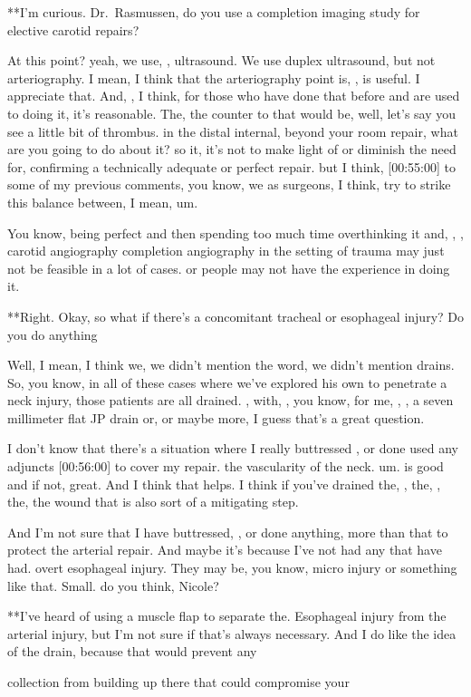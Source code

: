 \documentclass[
]{book}
\begin{document}
**I'm curious. Dr.~Rasmussen, do
you use a completion imaging study for elective carotid repairs?

At this
point? yeah, we use, , ultrasound. We use duplex ultrasound, but not
arteriography. I mean, I think that the arteriography point is, , is
useful. I appreciate that. And, , I think, for those who have done that
before and are used to doing it, it's reasonable. The, the counter to
that would be, well, let's say you see a little bit of thrombus. in the
distal internal, beyond your room repair, what are you going to do about
it? so it, it's not to make light of or diminish the need for,
confirming a technically adequate or perfect repair. but I think,
{[}00:55:00{]} to some of my previous comments, you know, we as surgeons, I
think, try to strike this balance between, I mean, um.

You know, being perfect and then spending too much time overthinking it
and, , , carotid angiography completion angiography in the setting of
trauma may just not be feasible in a lot of cases. or people may not
have the experience in doing it.

**Right. Okay, so what if there's
a concomitant tracheal or esophageal injury? Do you do anything

Well, I mean,
I think we, we didn't mention the word, we didn't mention drains. So,
you know, in all of these cases where we've explored his own to
penetrate a neck injury, those patients are all drained. , with, , you
know, for me, , , a seven millimeter flat JP drain or, or maybe more,
I guess that's a great question.

I don't know that there's a situation where I really buttressed , or
done used any adjuncts {[}00:56:00{]} to cover my repair. the
vascularity of the neck. um. is good and if not, great. And I think
that helps. I think if you've drained the, , the, , the, the wound that
is also sort of a mitigating step.

And I'm not sure that I have buttressed, , or done anything, more
than that to protect the arterial repair. And maybe it's because I've
not had any that have had. overt esophageal injury. They may be, you
know, micro injury or something like that. Small. do you think, Nicole?

**I've heard of using a muscle
flap to separate the. Esophageal injury from the arterial injury, but
I'm not sure if that's always necessary. And I do like the idea of the
drain, because that would prevent any

collection from building up there that could compromise your
\end{document}
